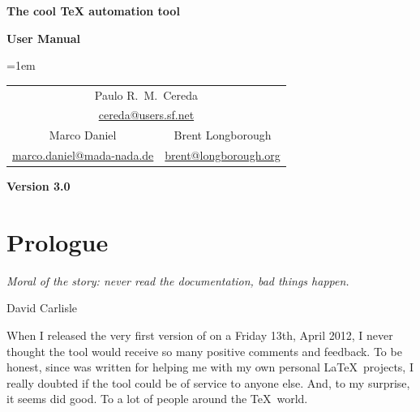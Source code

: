 \documentclass[a4paper,twoside,12pt]{memoir}
\newcommand{\araraversion}{3.0}
\begin{document}
\begin{titlingpage}

\begin{center}
\vspace*{2em}

\scalebox{1.15}{\araralogo}

\vspace{2em}

{\color{araracolor}\bfseries\Huge The cool \TeX{} automation tool}

\vspace{10em}

{\Huge\sffamily\bfseries User Manual}

\vspace{3em}

{\large
\tabcolsep=1em
\begin{tabular}{cc}
\multicolumn{2}{c}{Paulo R.\ M.\ Cereda}\\
\multicolumn{2}{c}{\url{cereda@users.sf.net}}\\[1.5em]
Marco Daniel & Brent Longborough\\
\url{marco.daniel@mada-nada.de} & \url{brent@longborough.org}
\end{tabular}}

\vfill

{\LARGE\sffamily\bfseries Version \araraversion}

\end{center}

\end{titlingpage}

\pagestyle{headings} 
\frontmatter
\nouppercaseheads

\chapter*{Prologue}
\label{chap:prologue}

\epigraph{\emph{Moral of the story: never read the documentation, bad things happen.}}{David Carlisle}

When I released the very first version of \arara on a Friday 13th, April 2012, I never thought the tool would
receive so many positive comments and feedback. To be honest, since \arara was written for helping me
with my own personal \LaTeX\ projects, I really doubted if the tool could be of service to anyone else. And,
to my surprise, it seems \arara did good. To a lot of people around the \TeX\ world.
\end{document}
